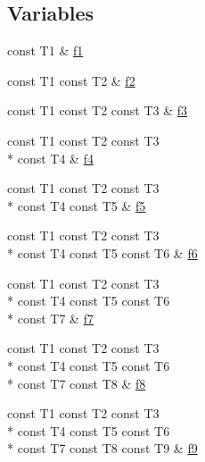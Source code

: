 \subsection*{Variables}
\begin{DoxyCompactItemize}
\item 
const T1 \& \hyperlink{namespacestd_1_1tr1_a9c0fa65b105f8e2f58ba59ecf75fd000}{f1}
\item 
const T1 const T2 \& \hyperlink{namespacestd_1_1tr1_a87dd9e009868361317f587126dba63d4}{f2}
\item 
const T1 const T2 const T3 \& \hyperlink{namespacestd_1_1tr1_a0f7c3b47d27d42d82d1a333ea420ce4e}{f3}
\item 
const T1 const T2 const T3 \\*
const T4 \& \hyperlink{namespacestd_1_1tr1_adc796e02b7385d526aff708189564f67}{f4}
\item 
const T1 const T2 const T3 \\*
const T4 const T5 \& \hyperlink{namespacestd_1_1tr1_a9c1eb66b2b2fa321942af95405232a0d}{f5}
\item 
const T1 const T2 const T3 \\*
const T4 const T5 const T6 \& \hyperlink{namespacestd_1_1tr1_a6b62f32e1e3e21bceb94eb46c4cbfd56}{f6}
\item 
const T1 const T2 const T3 \\*
const T4 const T5 const T6 \\*
const T7 \& \hyperlink{namespacestd_1_1tr1_a2185f3a1c07f2df072c39cb91ffa89a4}{f7}
\item 
const T1 const T2 const T3 \\*
const T4 const T5 const T6 \\*
const T7 const T8 \& \hyperlink{namespacestd_1_1tr1_ab998afa41cea8d6d26d7e4288b0bf974}{f8}
\item 
const T1 const T2 const T3 \\*
const T4 const T5 const T6 \\*
const T7 const T8 const T9 \& \hyperlink{namespacestd_1_1tr1_a5a31905861d0f793ee32942d6e3f5d72}{f9}
\end{DoxyCompactItemize}


